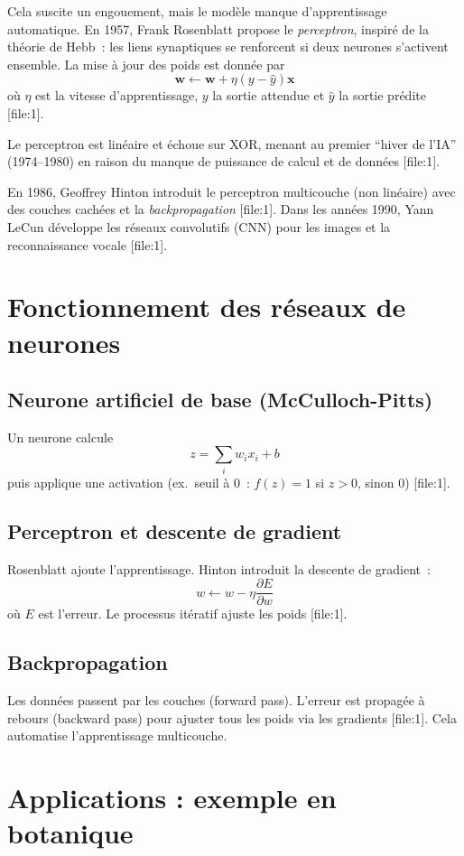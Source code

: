 \documentclass[12pt,a4paper]{article}
\begin{document}
Cela suscite un engouement, mais le mod\`ele manque d'apprentissage automatique. En 1957, Frank Rosenblatt propose le \emph{perceptron}, inspir\'e de la th\'eorie de Hebb~: les liens synaptiques se renforcent si deux neurones s'activent ensemble. La mise \`a jour des poids est donn\'ee par 
\[
\mathbf{w} \leftarrow \mathbf{w} + \eta (y - \hat{y}) \mathbf{x}
\]
o\`u $\eta$ est la vitesse d'apprentissage, $y$ la sortie attendue et $\hat{y}$ la sortie pr\'edite [file:1]. 

Le perceptron est lin\'eaire et \'echoue sur XOR, menant au premier ``hiver de l'IA'' (1974--1980) en raison du manque de puissance de calcul et de donn\'ees [file:1]. 

En 1986, Geoffrey Hinton introduit le perceptron multicouche (non lin\'eaire) avec des couches cach\'ees et la \emph{backpropagation} [file:1]. Dans les ann\'ees 1990, Yann LeCun d\'eveloppe les r\'eseaux convolutifs (CNN) pour les images et la reconnaissance vocale [file:1].

\section{Fonctionnement des r\'eseaux de neurones}

\subsection{Neurone artificiel de base (McCulloch-Pitts)}
Un neurone calcule 
\[
z = \sum_i w_i x_i + b
\]
puis applique une activation (ex.~seuil \`a 0~: $f(z) = 1$ si $z > 0$, sinon 0) [file:1].

\subsection{Perceptron et descente de gradient}
Rosenblatt ajoute l'apprentissage. Hinton introduit la descente de gradient~:
\[
w \leftarrow w - \eta \frac{\partial E}{\partial w}
\]
o\`u $E$ est l'erreur. Le processus it\'eratif ajuste les poids [file:1].

\subsection{Backpropagation}
Les donn\'ees passent par les couches (forward pass). L'erreur est propag\'ee \`a rebours (backward pass) pour ajuster tous les poids via les gradients [file:1]. Cela automatise l'apprentissage multicouche.

\section{Applications : exemple en botanique}
\end{document}
